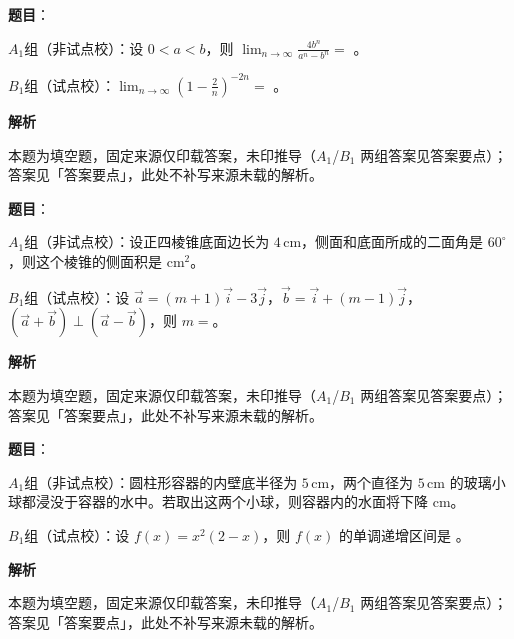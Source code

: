 \begin{answer}

\textbf{题目}：

$A_1$组（非试点校）：设 $0<a<b$，则 $\displaystyle\lim_{n\to\infty}\frac{4b^n}{a^n-b^n}=$ \gkblank{}。

$B_1$组（试点校）：$\displaystyle\lim_{n\to\infty}\left(1-\frac2n\right)^{-2n}=$ \gkblank{}。

\textbf{解析}

本题为填空题，固定来源仅印载答案，未印推导（$A_1$/$B_1$ 两组答案见答案要点）；答案见「答案要点」，此处不补写来源未载的解析。


\end{answer}
\begin{answer}

\textbf{题目}：

$A_1$组（非试点校）：设正四棱锥底面边长为 $4\,\mathrm{cm}$，侧面和底面所成的二面角是 $60^\circ$，则这个棱锥的侧面积是 \gkblank{} $\mathrm{cm}^2$。

$B_1$组（试点校）：设 $\vec a=(m+1)\vec i-3\vec j$，$\vec b=\vec i+(m-1)\vec j$，$(\vec a+\vec b)\perp(\vec a-\vec b)$，则 $m=$\gkblank{}。

\textbf{解析}

本题为填空题，固定来源仅印载答案，未印推导（$A_1$/$B_1$ 两组答案见答案要点）；答案见「答案要点」，此处不补写来源未载的解析。


\end{answer}
\begin{answer}

\textbf{题目}：

$A_1$组（非试点校）：圆柱形容器的内壁底半径为 $5\,\mathrm{cm}$，两个直径为 $5\,\mathrm{cm}$ 的玻璃小球都浸没于容器的水中。若取出这两个小球，则容器内的水面将下降 \gkblank{} $\mathrm{cm}$。

$B_1$组（试点校）：设 $f(x)=x^2(2-x)$，则 $f(x)$ 的单调递增区间是 \gkblank{}。

\textbf{解析}

本题为填空题，固定来源仅印载答案，未印推导（$A_1$/$B_1$ 两组答案见答案要点）；答案见「答案要点」，此处不补写来源未载的解析。


\end{answer}
